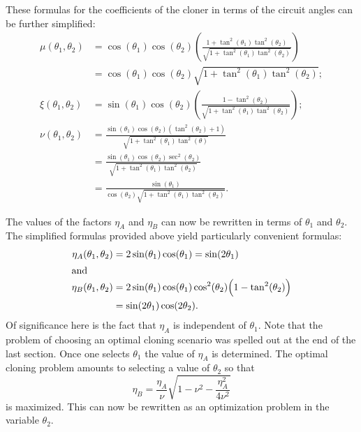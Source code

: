 \documentclass[reqno]{amsart}
\numberwithin{lemma}{section}
\numberwithin{proposition}{section}
\begin{document}
These formulas for the coefficients of the cloner in terms of the circuit angles can be further simplified:
\begin{align*}
	\mu(\theta_{1}, \theta_{2}) &= \cos(\theta_{1}) \cos(\theta_{2}) \left ( \frac{1 + \tan^{2}(\theta_{1}) \tan^{2}(\theta_{2})}{\sqrt{1 + \tan^{2}(\theta_{1}) \tan^{2}(\theta_{2})}} \right )\\
	&= \cos(\theta_{1}) \cos(\theta_{2}) \sqrt{1 + \tan^{2}(\theta_{1}) \tan^{2}(\theta_{2})};\\
	\xi(\theta_{1}, \theta_{2}) &= \sin(\theta_{1}) \cos(\theta_{2}) \left ( \frac{1 - \tan^{2}(\theta_{2})}{\sqrt{1 + \tan^{2}(\theta_{1}) \tan^{2}(\theta_{2})}}\right );\\
	\nu(\theta_{1}, \theta_{2}) &= \frac{\sin(\theta_{1}) \cos(\theta_{2}) ( \tan^{2}(\theta_{2}) + 1)}{\sqrt{1 + \tan^{2}(\theta_{1}) \tan^{2}(\theta)}}\\
	&= \frac{\sin(\theta_{1}) \cos(\theta_{2}) \sec^{2}(\theta_{2})}{\sqrt{1 + \tan^{2}(\theta_{1}) \tan^{2}(\theta_{2})}}\\
	&= \frac{\sin(\theta_{1})}{\cos(\theta_{2}) \sqrt{1 + \tan^{2}(\theta_{1}) \tan^{2}(\theta_{2})}}.
\end{align*}

The values of the factors $\eta_{A}$ and $\eta_{B}$ can now be rewritten in terms of $\theta_{1}$ and $\theta_{2}$. The simplified formulas provided above yield particularly convenient formulas:
\begin{align*}
	\eta_{A}(\theta_{1}, \theta_{2}) &= 2 \sin(\theta_{1}) \cos(\theta_{1}) = \sin(2 \theta_{1})\\
	\intertext{and}
	\eta_{B}(\theta_{1}, \theta_{2}) &= 2 \sin(\theta_{1}) \cos(\theta_{1}) \cos^{2}(\theta_{2}) \Big ( 1 - \tan^{2}(\theta_{2}) \Big )\\
	&= \sin(2 \theta_{1}) \cos(2 \theta_{2}).
\end{align*}
Of significance here is the fact that $\eta_{A}$ is independent of $\theta_{1}$. Note that the problem of choosing an optimal cloning scenario was spelled out at the end of the last section. Once one selects $\theta_{1}$ the value of $\eta_{A}$ is determined. The optimal cloning problem amounts to selecting a value of $\theta_{2}$ so that
\begin{equation*}
	\eta_{B} = \frac{\eta_{A}}{\nu} \sqrt{ 1 - \nu^{2} - \frac{\eta_{A}^{2}}{4 \nu^{2}}}
\end{equation*}
is maximized. This can now be rewritten as an optimization problem in the variable $\theta_{2}$.
\end{document}
